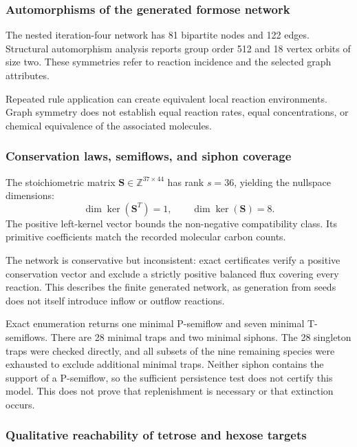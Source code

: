 \documentclass[pdflatex,referee]{../template/sn-jnl}
\theoremstyle{plain}%
\theoremstyle{definition}%
\theoremstyle{remark}%
\begin{document}
\subsubsection{Automorphisms of the generated formose network}

The nested iteration-four network has 81 bipartite nodes and 122 edges. Structural automorphism analysis reports group order 512 and 18 vertex orbits of size two. These symmetries refer to reaction incidence and the selected graph attributes.

Repeated rule application can create equivalent local reaction environments. Graph symmetry does not establish equal reaction rates, equal concentrations, or chemical equivalence of the associated molecules.

\subsubsection{Conservation laws, semiflows, and siphon coverage}

The stoichiometric matrix $\mathbf{S} \in \mathbb{Z}^{37 \times 44}$ has rank $s = 36$, yielding the nullspace dimensions:
\begin{equation}
\dim\ker(\mathbf{S}^{T}) = 1,
\qquad
\dim\ker(\mathbf{S}) = 8.
\end{equation}
The positive left-kernel vector bounds the non-negative compatibility class. Its primitive coefficients match the recorded molecular carbon counts.

The network is conservative but inconsistent: exact certificates verify a positive conservation vector and exclude a strictly positive balanced flux covering every reaction. This describes the finite generated network, as generation from seeds does not itself introduce inflow or outflow reactions.

Exact enumeration returns one minimal P-semiflow and seven minimal T-semiflows. There are 28 minimal traps and two minimal siphons. The 28 singleton traps were checked directly, and all subsets of the nine remaining species were exhausted to exclude additional minimal traps. Neither siphon contains the support of a P-semiflow, so the sufficient persistence test does not certify this model. This does not prove that replenishment is necessary or that extinction occurs.

\subsubsection{Qualitative reachability of tetrose and hexose targets}
\end{document}
